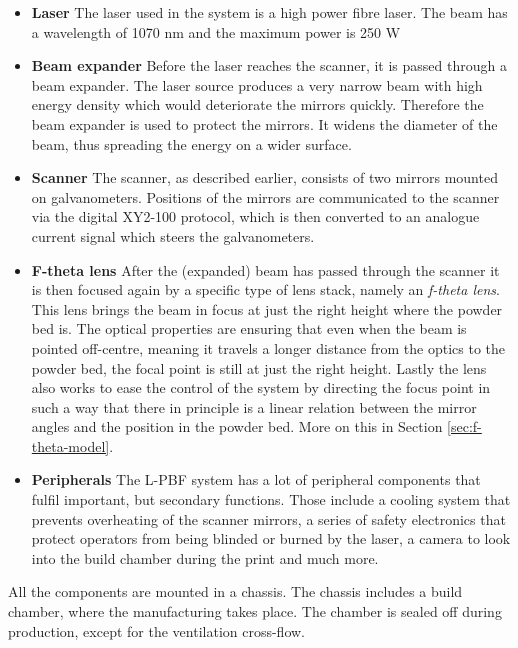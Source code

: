 \begin{itemize}
    \item \textbf{Laser} The laser used in the system is a high power fibre laser. The beam has a wavelength of 1070 nm and the maximum power is 250 W
    \item \textbf{Beam expander} Before the laser reaches the scanner, it is passed through a beam expander. The laser source produces a very narrow beam with high energy density which would deteriorate the mirrors quickly. Therefore the beam expander is used to protect the mirrors. It widens the diameter of the beam, thus spreading the energy on a wider surface.
    \item \textbf{Scanner} The scanner, as described earlier, consists of two mirrors mounted on galvanometers. Positions of the mirrors are communicated to the scanner via the digital XY2-100 protocol, which is then converted to an analogue current signal which steers the galvanometers.
    \item \textbf{F-theta lens} After the (expanded) beam has passed through the scanner it is then focused again by a specific type of lens stack, namely an \textit{f-theta lens}. This lens brings the beam in focus at just the right height where the powder bed is. The optical properties are ensuring that even when the beam is pointed off-centre, meaning it travels a longer distance from the optics to the powder bed, the focal point is still at just the right height. Lastly the lens also works to ease the control of the system by directing the focus point in such a way that there in principle is a linear relation between the mirror angles and the position in the powder bed. More on this in Section \ref{sec:f-theta-model}.
    \item \textbf{Peripherals} The L-PBF system has a lot of peripheral components that fulfil important, but secondary functions. Those include a cooling system that prevents overheating of the scanner mirrors, a series of safety electronics that protect operators from being blinded or burned by the laser, a camera to look into the build chamber during the print and much more.
\end{itemize}

All the components are mounted in a chassis. The chassis includes a build chamber, where the manufacturing takes place. The chamber is sealed off during production, except for the ventilation cross-flow.

